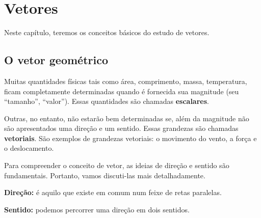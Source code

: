 \chapter{Vetores}

Neste capítulo, teremos os conceitos básicos do estudo de vetores.

\section{O vetor geométrico}

Muitas quantidades físicas tais como área, comprimento, massa, temperatura, ficam completamente determinadas quando é fornecida sua magnitude (seu ``tamanho'', ``valor''). Essas quantidades são chamadas \textbf{escalares}.

Outras, no entanto, não estarão bem determinadas se, além da magnitude não são apresentados uma direção e um sentido. Essas grandezas são chamadas \textbf{vetoriais}. São exemplos de grandezas vetoriais: o movimento do vento, a força e o deslocamento.

Para compreender o conceito de vetor, as ideias de direção e sentido são fundamentais. Portanto, vamos discuti-las mais detalhadamente.

\textbf{Direção:} é aquilo que existe em comum num feixe de retas paralelas.

\textbf{Sentido:} podemos percorrer uma direção em dois sentidos.

